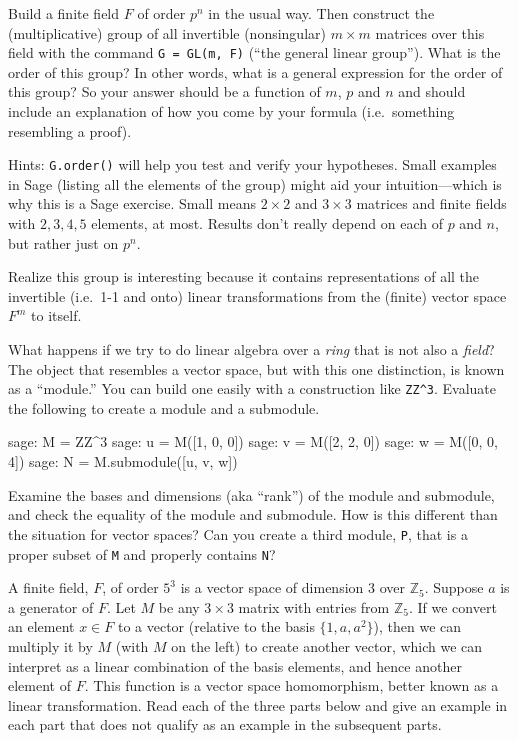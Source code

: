 \begin{sageverbatim}\end{sageverbatim}
%
%
Build a finite field $F$ of order $p^n$ in the usual way.  Then construct the (multiplicative) group of all invertible (nonsingular) $m\times m$ matrices over this field with the command \verb?G = GL(m, F)? (``the general linear group'').  What is the order of this group?  In other words, what is a general expression for the order of this group?  So your answer should be a function of $m$, $p$ and $n$ and should include an explanation of how you come by your formula (i.e.\ something resembling a proof).\par
%
Hints:  \verb?G.order()? will help you test and verify your hypotheses.  Small examples in Sage (listing all the elements of the group) might aid your intuition---which is why this is a Sage exercise.  Small means $2\times 2$ and $3\times 3$ matrices and finite fields with $2,3,4,5$ elements, at most.  Results don't really depend on each of $p$ and $n$, but rather just on $p^n$.\par
%
Realize this group is interesting because it contains representations of all the invertible (i.e.\ 1-1 and onto) linear transformations from the (finite) vector space $F^m$ to itself.
\begin{sageverbatim}\end{sageverbatim}
%
%
What happens if we try to do linear algebra over a \emph{ring} that is not also a \emph{field}?  The object that resembles a vector space, but with this one distinction, is known as a ``module.''  You can build one easily with a construction like \verb?ZZ^3?.  Evaluate the following to create a module and a submodule.
%
\begin{sageexample}
sage: M = ZZ^3
sage: u = M([1, 0, 0])
sage: v = M([2, 2, 0])
sage: w = M([0, 0, 4])
sage: N = M.submodule([u, v, w])
\end{sageexample}
%
Examine the bases and dimensions (aka ``rank'') of the module and submodule, and check the equality of the module and submodule.  How is this different than the situation for vector spaces?  Can you create a third module, \verb?P?, that is a proper subset of \verb?M? and properly contains \verb?N??
\begin{sageverbatim}\end{sageverbatim}
%
%
A finite field, $F$, of order $5^3$ is a vector space of dimension 3 over ${\mathbb Z}_5$.  Suppose $a$ is a generator of $F$.  Let $M$ be any $3\times 3$ matrix with entries from ${\mathbb Z}_5$.  If we convert an element $x\in F$ to a vector (relative to the basis $\{1,a,a^2\}$), then we can multiply it by $M$ (with $M$ on the left) to create another vector, which we can interpret as a linear combination of the basis elements, and hence another element of $F$.  This function is a vector space homomorphism, better known as a linear transformation.  Read each of the three parts below and give an example in each part that does not qualify as an example in the subsequent parts.\\

